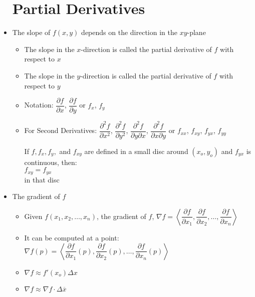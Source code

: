 \begin{itemize}

    \section{Partial Derivatives}

  \item The slope of $f(x,y)$ depends on the direction in the $xy$-plane

    \begin{itemize}

      \item The slope in the $x$-direction is called the partial derivative of $f$ with respect to $x$

      \item The slope in the $y$-direction is called the partial derivative of $f$ with respect to $y$

      \item Notation: $\dfrac{\partial f}{\partial x}$, $\dfrac{\partial f}{\partial y}$ or $f_x$, $f_y$

      \item For Second Derivatives: $\dfrac{\partial^2 f}{\partial x^2}$, $\dfrac{\partial^2 f}{\partial y^2}$, $\dfrac{\partial^2 f}{\partial y \partial x}$, $\dfrac{\partial^2 f}{\partial x \partial y}$ or $f_{xx}$, $f_{xy}$, $f_{yx}$, $f_{yy}$

        \vspace{10pt}

        \begin{center}
        If $f,f_x,f_y,$ and $f_{xy}$ are defined in a small disc around $(x_o,y_o)$ and $f_{yx}$ is continuous, then:\\ $f_{xy}=f_{yx}$\\in that disc
        \end{center}

    \end{itemize}

  \item The gradient of $f$

    \begin{itemize}

      \item Given $f(x_1,x_2,\dots,x_n)$, the gradient of $f$, $\nabla f=\left\langle \dfrac{\partial f}{\partial x_1}, \dfrac{\partial f}{\partial x_2}, \dots, \dfrac{\partial f}{\partial x_n} \right\rangle$

      \item It can be computed at a point: $\nabla f(p)=\left\langle \dfrac{\partial f}{\partial x_1}(p), \dfrac{\partial f}{\partial x_2}(p), \dots, \dfrac{\partial f}{\partial x_n}(p) \right\rangle$


      \item $\nabla f\approx f'(x_o)\Delta x$

      \item $\nabla f \approx \nabla f \cdot \Delta \overline{x}$

    \end{itemize}

\end{itemize}



